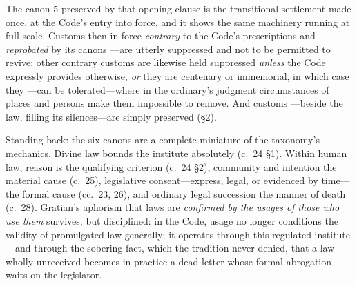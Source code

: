 The canon 5 preserved by that opening clause is the transitional settlement made once, at the Code's entry into force, and it shows the same machinery running at full scale. Customs then in force \emph{contrary} to the Code's prescriptions and \emph{reprobated} by its canons ---are utterly suppressed and not to be permitted to revive; other contrary customs are likewise held suppressed \emph{unless} the Code expressly provides otherwise, \emph{or} they are centenary or immemorial, in which case they ---can be tolerated---where in the ordinary's judgment circumstances of places and persons make them impossible to remove. And customs ---beside the law, filling its silences---are simply preserved (§2).

Standing back: the six canons are a complete miniature of the taxonomy's mechanics. Divine law bounds the institute absolutely (c.~24 §1). Within human law, reason is the qualifying criterion (c.~24 §2), community and intention the material cause (c.~25), legislative consent---express, legal, or evidenced by time---the formal cause (cc.~23, 26), and ordinary legal succession the manner of death (c.~28). Gratian's aphorism that laws are \emph{confirmed by the usages of those who use them} survives, but disciplined: in the Code, usage no longer conditions the validity of promulgated law generally; it operates through this regulated institute---and through the sobering fact, which the tradition never denied, that a law wholly unreceived becomes in practice a dead letter whose formal abrogation waits on the legislator.
